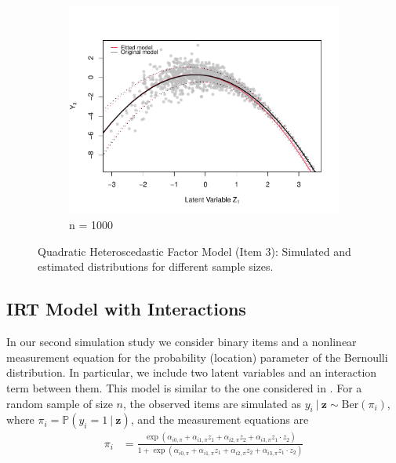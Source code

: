 \documentclass[11pt, a4paper]{article}
\newcommand{\cond}{\!~|~\!}
\begin{document}
\begin{figure}
\begin{subfigure}[b]{0.3\textwidth}
    \includegraphics[width=\textwidth]{n1000_GausQTHT}
    \caption{n = 1000}
    \label{fig:Sim1n1000}
\end{subfigure}
\caption{Quadratic Heteroscedastic Factor Model (Item 3): Simulated and estimated distributions for different sample sizes.}\label{fig:Sim1}
\end{figure}

\subsection{IRT Model with Interactions}

In our second simulation study we consider binary items and a nonlinear measurement equation for the probability (location) parameter of the Bernoulli distribution. In particular, we include two latent variables and an interaction term between them. This model is similar to the one considered in \citet{Rizopoulos&Moustaki_BJMSP2008}. For a random sample of size $n$, the observed items are simulated as $y_{i} \cond \mathbf{z} \sim \text{Ber}(\pi_{i})$, where $\pi_i = \mathbb{P}(y_{i} = 1 \cond \mathbf{z})$, and the measurement equations are
\begin{align*}
\pi_i & = \frac{\exp\left(\alpha_{i0,\pi} + \alpha_{i1,\pi} z_1 + \alpha_{i2,\pi} z_2 + \alpha_{i3,\pi} z_1 \cdot z_2 \right)}{ 1 + \exp\left(\alpha_{i0,\pi} + \alpha_{i1,\pi} z_1 + \alpha_{i2,\pi} z_2 + \alpha_{i3,\pi} z_1 \cdot z_2 \right)}
\end{align*}
\end{document}
